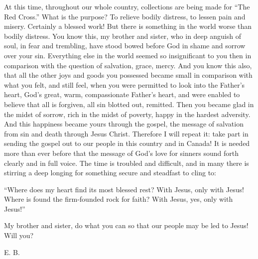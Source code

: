 At this time, throughout our whole country, collections are being made for “The Red Cross.” What is the purpose? To relieve bodily distress, to lessen pain and misery. Certainly a blessed work! But there is something in the world worse than bodily distress. You know this, my brother and sister, who in deep anguish of soul, in fear and trembling, have stood bowed before God in shame and sorrow over your sin. Everything else in the world seemed so insignificant to you then in comparison with the question of salvation, grace, mercy. And you know this also, that all the other joys and goods you possessed became small in comparison with what you felt, and still feel, when you were permitted to look into the Father’s heart, God’s great, warm, compassionate Father’s heart, and were enabled to believe that all is forgiven, all sin blotted out, remitted. Then you became glad in the midst of sorrow, rich in the midst of poverty, happy in the hardest adversity. And this happiness became yours through the gospel, the message of salvation from sin and death through Jesus Christ. Therefore I will repeat it: take part in sending the gospel out to our people in this country and in Canada! It is needed more than ever before that the message of God’s love for sinners sound forth clearly and in full voice. The time is troubled and difficult, and in many there is stirring a deep longing for something secure and steadfast to cling to:

“Where does my heart find its most blessed rest?
With Jesus, only with Jesus!
Where is found the firm-founded rock for faith?
With Jesus, yes, only with Jesus!”

My brother and sister, do what you can so that our people may be led to Jesus! Will you?

E. B.
